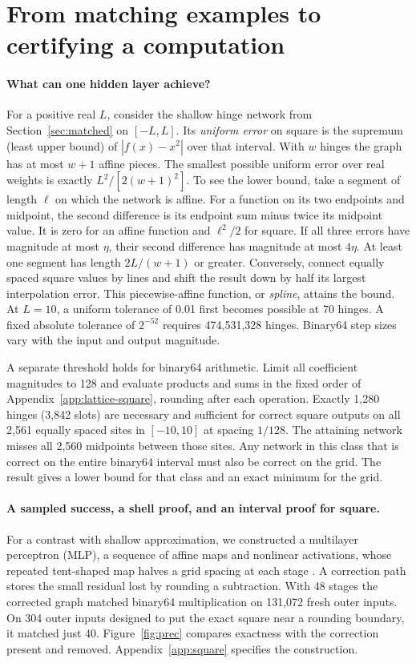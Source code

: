 \section{From matching examples to certifying a computation}\label{sec:tasks}
\paragraph{What can one hidden layer achieve?}
For a positive real $L$, consider the shallow hinge network from Section~\ref{sec:matched} on $[-L,L]$. Its \emph{uniform error} on square is the supremum (least upper bound) of $|f(x)-x^2|$ over that interval. With $w$ hinges the graph has at most $w+1$ affine pieces. The smallest possible uniform error over real weights is exactly $L^2/[2(w+1)^2]$. To see the lower bound, take a segment of length $\ell$ on which the network is affine. For a function on its two endpoints and midpoint, the second difference is its endpoint sum minus twice its midpoint value. It is zero for an affine function and $\ell^2/2$ for square. If all three errors have magnitude at most $\eta$, their second difference has magnitude at most $4\eta$. At least one segment has length $2L/(w+1)$ or greater. Conversely, connect equally spaced square values by lines and shift the result down by half its largest interpolation error. This piecewise-affine function, or \emph{spline}, attains the bound. At $L=10$, a uniform tolerance of 0.01 first becomes possible at 70 hinges. A fixed absolute tolerance of $2^{-52}$ requires 474,531,328 hinges. Binary64 step sizes vary with the input and output magnitude.

A separate threshold holds for binary64 arithmetic. Limit all coefficient magnitudes to 128 and evaluate products and sums in the fixed order of Appendix~\ref{app:lattice-square}, rounding after each operation. Exactly 1,280 hinges (3,842 slots) are necessary and sufficient for correct square outputs on all 2,561 equally spaced sites in $[-10,10]$ at spacing $1/128$. The attaining network misses all 2,560 midpoints between those sites. Any network in this class that is correct on the entire binary64 interval must also be correct on the grid. The result gives a lower bound for that class and an exact minimum for the grid.

\paragraph{A sampled success, a shell proof, and an interval proof for square.}
For a contrast with shallow approximation, we constructed a multilayer perceptron (MLP), a sequence of affine maps and nonlinear activations, whose repeated tent-shaped map halves a grid spacing at each stage \cite{yarotsky2017error}. A correction path stores the small residual lost by rounding a subtraction. With 48 stages the corrected graph matched binary64 multiplication on 131,072 fresh outer inputs. On 304 outer inputs designed to put the exact square near a rounding boundary, it matched just 40. Figure~\ref{fig:prec} compares exactness with the correction present and removed. Appendix~\ref{app:square} specifies the construction.

